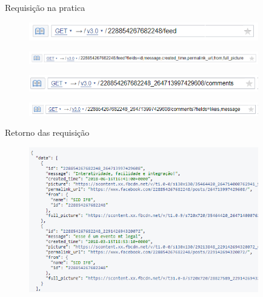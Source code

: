 \documentclass{aula-ifb}
\begin{document}
\begin{frame}{Requisição na pratica}
	\begin{figure}[h]
		\includegraphics[width=10cm]{figuras/requisicao3.png}
		\label{fig:facebookgraph}
	\end{figure}

	\begin{figure}[h]
		\includegraphics[width=10cm]{figuras/requisicao1.png}
		\label{fig:facebookgraph}
	\end{figure}
	
	\begin{figure}[h]
		\includegraphics[width=10cm]{figuras/requisicao4.png}
		\label{fig:facebookgraph}
	\end{figure}
	
	\begin{figure}[h]
		\includegraphics[width=10cm]{figuras/requisicao5.png}
		\label{fig:facebookgraph}
	\end{figure}
\end{frame}

\begin{frame}{Retorno das requisição}
\begin{figure}[h]
\includegraphics[width=10cm]{figuras/requisicao2.png}
\label{fig:facebookgraph}
\end{figure}
\end{frame}
\end{document}
